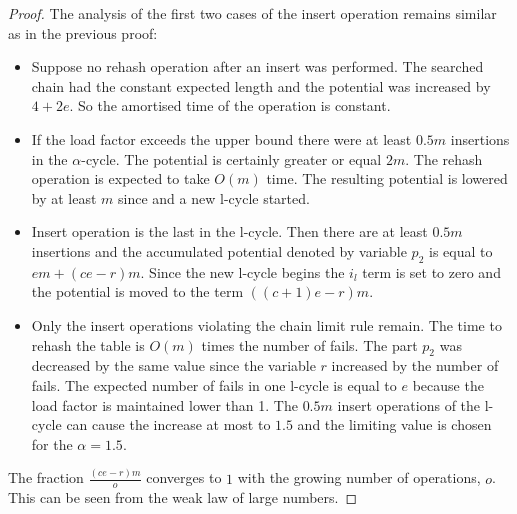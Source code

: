 \begin{proof}
The analysis of the first two cases of the insert operation remains similar as in the previous proof:
\begin{itemize}
\item Suppose no rehash operation after an insert was performed. The searched chain had the constant expected length and the potential was increased by $4 + 2e$. So the amortised time of the operation is constant.
\item If the load factor exceeds the upper bound there were at least $0.5 m$ insertions in the $\alpha$-cycle. The potential is certainly greater or equal $2m$. The rehash operation is expected to take $O(m)$ time. The resulting potential is lowered by at least $m$ since and a new l-cycle started.
\item Insert operation is the last in the l-cycle. Then there are at least $0.5 m$ insertions and the accumulated potential denoted by variable $p_2$ is equal to $em + (ce - r)m$. Since the new l-cycle begins the $i_l$ term is set to zero and the potential is moved to the term $((c + 1)e -r)m$.
\item Only the insert operations violating the chain limit rule remain. The time to rehash the table is $O(m)$ times the number of fails. The part $p_2$ was decreased by the same value since the variable $r$ increased by the number of fails. The expected number of fails in one l-cycle is equal to $e$ because the load factor is maintained lower than 1. The $0.5 m$ insert operations of the l-cycle can cause the increase at most to $1.5$ and the limiting value is chosen for the $\alpha = 1.5$.
\end{itemize}

The fraction $\frac{(ce - r)m}{o}$ converges to $1$ with the growing number of operations, $o$. This can be seen from the weak law of large numbers.
\end{proof}
